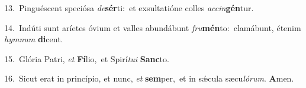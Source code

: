 {\numbfont\textcolor{\numbcolor}{13.}}~Pinguéscent speciósa \textit{de}\-\textbf{sér}ti:~\star et exsultatióne colles \textit{ac}\-\textit{cin}\textbf{gén}tur.\par
{\numbfont\textcolor{\numbcolor}{14.}}~Indúti sunt aríetes óvium et valles abundábunt \textit{fru}\-\textbf{mén}to:~\star clamábunt, étenim \textit{hym}\-\textit{num} \textbf{di}\-cent.\par
{\numbfont\textcolor{\numbcolor}{15.}}~Glória Patri, \textit{et} \textbf{Fí}\-lio,~\star et Spirí\-\textit{tu}\-\textit{i} \textbf{Sanc}\-to.\par
{\numbfont\textcolor{\numbcolor}{16.}}~Sicut erat in princípio, et nunc, \textit{et} \textbf{sem}\-per,~\star et in sǽcula sæcu\-\textit{ló}\-\textit{rum}. \textbf{A}\-men.\par
